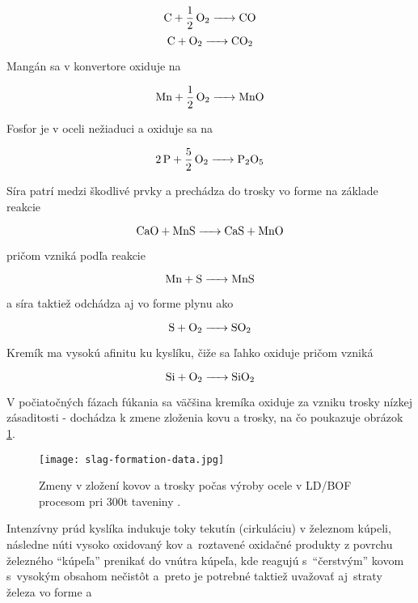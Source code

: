 \begin{equation}
\ce{C + 1/2O2 -> CO}
\end{equation}
\begin{equation}
\ce{C + O2 -> CO2}
\end{equation}

Mangán sa v konvertore oxiduje na 

\begin{equation}
\ce{Mn + 1/2O2 -> MnO}
\end{equation}

Fosfor je v oceli nežiaduci a oxiduje sa na 

\begin{equation}
\ce{2P + 5/2O2 -> P2O5}
\end{equation}

Síra patrí medzi škodlivé prvky a prechádza do trosky vo forme  na základe reakcie 

\begin{equation}
\ce{CaO + MnS -> CaS + MnO}
\end{equation}

pričom  vzniká podľa reakcie

\begin{equation}
\ce{Mn + S -> MnS}
\end{equation}

a síra taktiež odchádza aj vo forme plynu ako 

\begin{equation}
\ce{S + O2 -> SO2}
\end{equation}

Kremík ma vysokú afinitu ku kyslíku, čiže sa ľahko oxiduje pričom vzniká 

\begin{equation}
\ce{Si + O2 -> SiO2}
\end{equation}

V počiatočných fázach fúkania sa väčšina kremíka oxiduje za vzniku trosky nízkej zásaditosti - dochádza k zmene zloženia kovu a trosky, na čo poukazuje obrázok \ref{o:20}.

\begin{figure}[h!]
	\centering
	\texttt{[image: slag-formation-data.jpg]}
	\caption{Zmeny v zložení kovov a trosky počas výroby ocele v LD/BOF procesom pri 300t taveniny \citep{Turkdogan1996}.}
	\label{o:20}
\end{figure}

Intenzívny prúd kyslíka indukuje toky tekutín (cirkuláciu) v železnom kúpeli, následne núti vysoko oxidovaný kov a~roztavené oxidačné produkty z povrchu železného “kúpeľa” prenikať do vnútra kúpeľa, kde reagujú s~“čerstvým” kovom s~vysokým obsahom nečistôt a~preto je potrebné taktiež uvažovať aj~straty železa vo forme  a~

